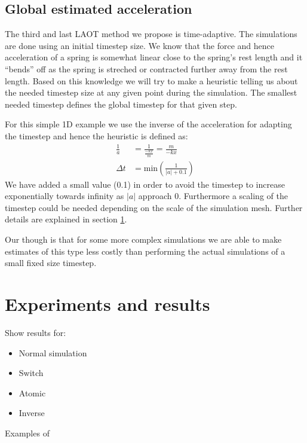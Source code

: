 \documentclass[twoside]{article}
\providecommand{\abs}[1]{\left \lvert #1 \right \rvert}
\begin{document}
\begin{multicols}{2}
\subsection{Global estimated acceleration}
The third and last LAOT method we propose is time-adaptive. The simulations are
done using an initial timestep size. We know that the force and hence
acceleration of a spring is somewhat linear close to the spring's rest length
and it ``bends'' off as the spring is streched or contracted further away from
the rest length. Based on this knowledge we will try to make a heuristic
telling us about the needed timestep size at any given point during the
simulation. The smallest needed timestep defines the global timestep for that
given step.

For this simple 1D example we use the inverse of the acceleration
for adapting the timestep and hence the heuristic is defined as:
\begin{align}
    \frac{1}{a} &= \frac{1}{\frac{-kx}{m}} = \frac{m}{-kx} \\
    \Delta t &= \text{min}\left( \frac{1}{\abs{a} + 0.1} \right )
\end{align}
We have added a small value (0.1) in order to avoid the timestep to increase
exponentially towards infinity as $\abs{a}$ approach 0. Furthermore a scaling of the timestep
could be needed depending on the scale of the simulation mesh. Further details
are explained in section \ref{sec:experiments}.

Our though is that for some more
complex simulations we are able to make estimates of this type less costly than
performing the actual simulations of a small fixed size timestep.


\section{Experiments and results}
\label{sec:experiments}

Show results for:

\begin{itemize}
    \item Normal simulation
    \item Switch
    \item Atomic
    \item Inverse
\end{itemize}


Examples of


\end{multicols}
\end{document}

